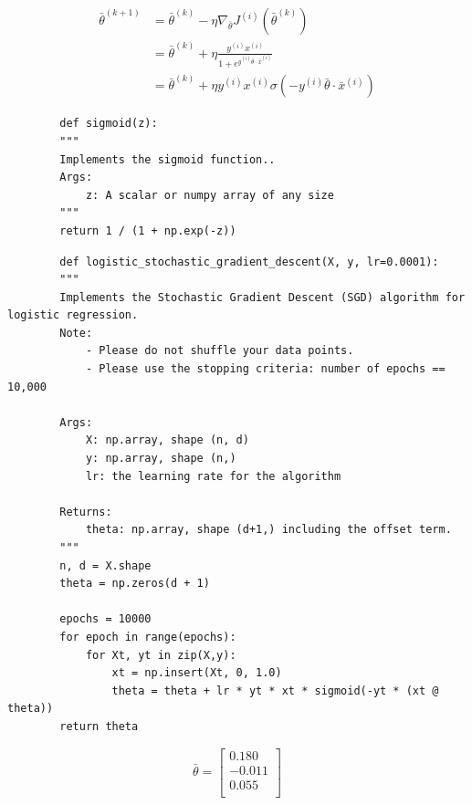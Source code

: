 \documentclass[12pt, letterpaper]{article}
\begin{document}
\begin{subproblem}{}
    
\end{subproblem}
\begin{solution}
    \begin{align*}
        \bar{\theta}^{(k+1)} &= \bar{\theta}^{(k)} - \eta \nabla_{\bar{\theta}} J^{(i)}(\bar{\theta}^{(k)})\\
                             &= \bar{\theta}^{(k)} + \eta \frac{y^{(i)}x^{(i)}}{1+e^{y^{(i)}\bar{\theta}\cdot \bar{x}^{(i)}}}\\
                             &= \bar{\theta}^{(k)} + \eta y^{(i)}x^{(i)}\sigma(-y^{(i)}\bar{\theta}\cdot \bar{x}^{(i)})
    \end{align*}
\end{solution}

\begin{subproblem}{}
    
\end{subproblem}
\begin{solution}
    \begin{verbatim}
        def sigmoid(z):
        """ 
        Implements the sigmoid function..
        Args:
            z: A scalar or numpy array of any size
        """
        return 1 / (1 + np.exp(-z))
    \end{verbatim}
    \begin{verbatim}
        def logistic_stochastic_gradient_descent(X, y, lr=0.0001):
        """
        Implements the Stochastic Gradient Descent (SGD) algorithm for logistic regression.
        Note:
            - Please do not shuffle your data points.
            - Please use the stopping criteria: number of epochs == 10,000
        
        Args:
            X: np.array, shape (n, d) 
            y: np.array, shape (n,)
            lr: the learning rate for the algorithm
        
        Returns:
            theta: np.array, shape (d+1,) including the offset term.
        """
        n, d = X.shape
        theta = np.zeros(d + 1)
        
        epochs = 10000
        for epoch in range(epochs):
            for Xt, yt in zip(X,y):
                xt = np.insert(Xt, 0, 1.0)
                theta = theta + lr * yt * xt * sigmoid(-yt * (xt @ theta))
        return theta
    \end{verbatim}
    \[\bar{\theta} = \begin{bmatrix}
        0.180\\
        -0.011\\
        0.055\\
    \end{bmatrix}\]
\end{solution}
\end{document}
